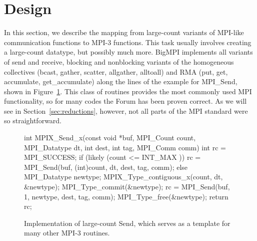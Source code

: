 
\section{Design}
\label{sec:design}

In this section, we describe the mapping from large-count variants
of MPI-like communication functions to MPI-3 functions.
This task usually
involves creating a large-count datatype, but possibly much more.
BigMPI implements all variants of send and receive, blocking and nonblocking variants of
the homogeneous collectives (bcast, gather, scatter, allgather, alltoall)
and RMA (put, get, accumulate, get\_accumulate)
along the lines of the example for MPI\_Send, shown in Figure~\ref{code:mpi_send_x}.
This class of routines provides the most commonly used MPI functionality, 
so for many codes the Forum has been proven correct.  
As we will see in Section~\ref{sec:reductions}, however,
not all parts of the MPI standard were so straightforward.

\begin{figure}
\begin{code}
int MPIX_Send_x(const void *buf, MPI_Count count,
                MPI_Datatype dt, int dest,
                int tag, MPI_Comm comm)
{
    int rc = MPI_SUCCESS;
    if (likely (count <= INT_MAX )) {
        rc = MPI_Send(buf, (int)count, dt, dest, tag, comm);
    } else {
        MPI_Datatype newtype;
        MPIX_Type_contiguous_x(count, dt, &newtype);
        MPI_Type_commit(&newtype);
        rc = MPI_Send(buf, 1, newtype, dest, tag, comm);
        MPI_Type_free(&newtype);
    }
    return rc;
}
\end{code}
\caption{Implementation of large-count Send, which serves as a template
for many other MPI-3 routines.\label{code:mpi_send_x}}
\end{figure}


